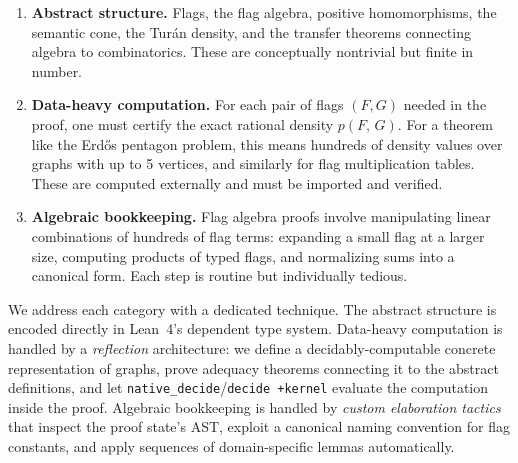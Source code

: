 \documentclass{article}
\newcommand{\den}[2]{p(#1,\,#2)}
\newcommand{\lean}[1]{\texttt{#1}}
\begin{document}
\begin{enumerate}
  \item \textbf{Abstract structure.}  Flags, the flag algebra, positive
    homomorphisms, the semantic cone, the Turán density, and the transfer
    theorems connecting algebra to combinatorics.  These are conceptually
    nontrivial but finite in number.

  \item \textbf{Data-heavy computation.}  For each pair of flags $(F, G)$
    needed in the proof, one must certify the exact rational density
    $\den{F}{G}$.  For a theorem like the Erd\H{o}s pentagon problem, this
    means hundreds of density values over graphs with up to 5 vertices, and
    similarly for flag multiplication tables.  These are computed externally
    and must be imported and verified.

  \item \textbf{Algebraic bookkeeping.}  Flag algebra proofs involve
    manipulating linear combinations of hundreds of flag terms: expanding a
    small flag at a larger size, computing products of typed flags, and
    normalizing sums into a canonical form.  Each step is routine but
    individually tedious.
\end{enumerate}

We address each category with a dedicated technique.  The abstract structure is
encoded directly in Lean~4's dependent type system.  Data-heavy computation is
handled by a \emph{reflection} architecture: we define a decidably-computable
concrete representation of graphs, prove adequacy theorems connecting it to the
abstract definitions, and let \lean{native\_decide}/\lean{decide +kernel}
evaluate the computation inside the proof.  Algebraic bookkeeping is handled by
\emph{custom elaboration tactics} that inspect the proof state's AST,
exploit a canonical naming convention for flag constants, and apply sequences
of domain-specific lemmas automatically.
\end{document}
